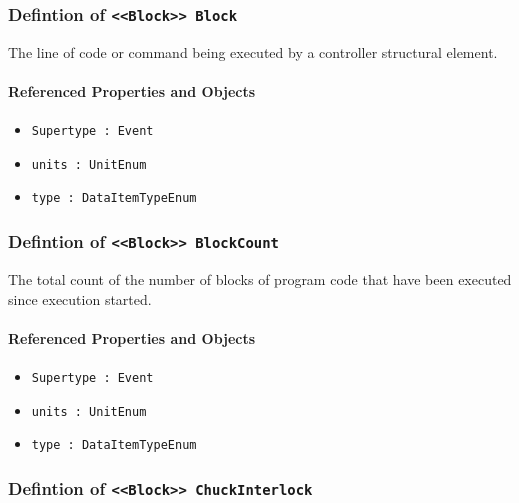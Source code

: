 \subsubsection{Defintion of \texttt{<<Block>> Block}}
  \label{type:Block}

\FloatBarrier

The line of code or command being executed by a controller structural element.

\FloatBarrier
\paragraph{Referenced Properties and Objects}

\begin{itemize}
\item \texttt{Supertype : Event}

\item \texttt{units : UnitEnum}

\item \texttt{type : DataItemTypeEnum}

\end{itemize}
\FloatBarrier
\subsubsection{Defintion of \texttt{<<Block>> BlockCount}}
  \label{type:BlockCount}

\FloatBarrier

The total count of the number of blocks of program code that have been executed since execution started.

\FloatBarrier
\paragraph{Referenced Properties and Objects}

\begin{itemize}
\item \texttt{Supertype : Event}

\item \texttt{units : UnitEnum}

\item \texttt{type : DataItemTypeEnum}

\end{itemize}
\FloatBarrier
\subsubsection{Defintion of \texttt{<<Block>> ChuckInterlock}}
  \label{type:ChuckInterlock}

